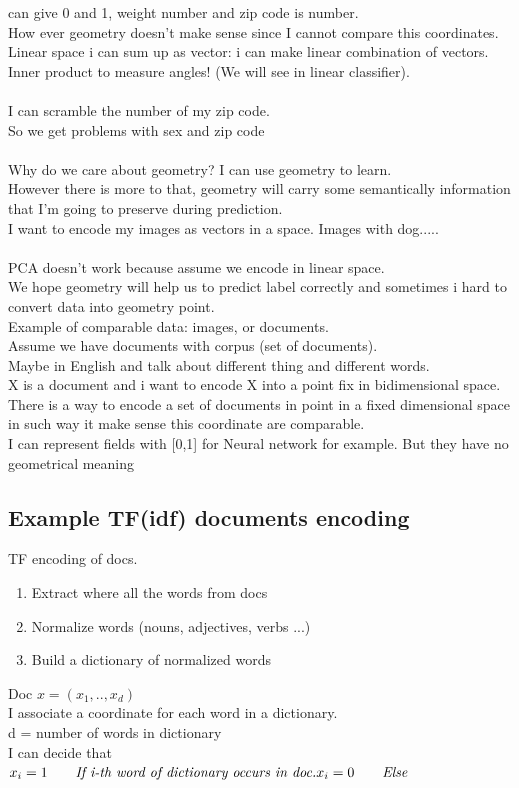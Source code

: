\documentclass[../main.tex]{subfiles}
\begin{document}
can give 0 and 1, weight number and zip code is number.\\
How ever geometry doesn’t make sense since I cannot compare this
coordinates.\\
Linear space i can sum up as vector: i can make linear combination of
vectors.\\
Inner product to measure angles! (We will see in linear classifier).\\\\
I can scramble the number of my zip code.\\
So we get problems with sex and zip code\\\\
Why do we care about geometry? I can use geometry to learn.\\
However there is more to that, geometry will carry some semantically
information that I’m going to preserve during prediction.\\
I want to encode my images as vectors in a space. Images with dog.....\\\\
PCA doesn’t work because assume we encode in linear space.\\
We hope geometry will help us to predict label correctly and sometimes i hard
to convert data into geometry point.\\
Example of comparable data: images, or documents. \\
Assume we have documents with corpus (set of documents).\\
Maybe in English and talk about different thing and different words.\\
X is a document and i want to encode X into a point fix in bidimensional
space.\\
There is a way to encode a set of documents in point in a fixed dimensional
space in such way it make sense this coordinate are comparable.\\
I can represent fields with [0,1] for Neural network for example. But they have no geometrical meaning\\

\subsection{Example TF(idf) documents encoding} 
TF encoding of docs.
\begin{enumerate}
\item Extract where all the words from docs
\item Normalize words (nouns, adjectives, verbs ...)
\item Build a dictionary of normalized words
\end{enumerate}
Doc $x = (x_1, .., x_d) $\\
I associate a coordinate for each word in a dictionary.\\
d = number of words in dictionary\\
I can decide that \\
$x_i = 1 \qquad \textit{If i-th word of dictionary occurs in doc.}\\
 x_i = 0 \qquad \textit{Else} 
$\\
\end{document}
